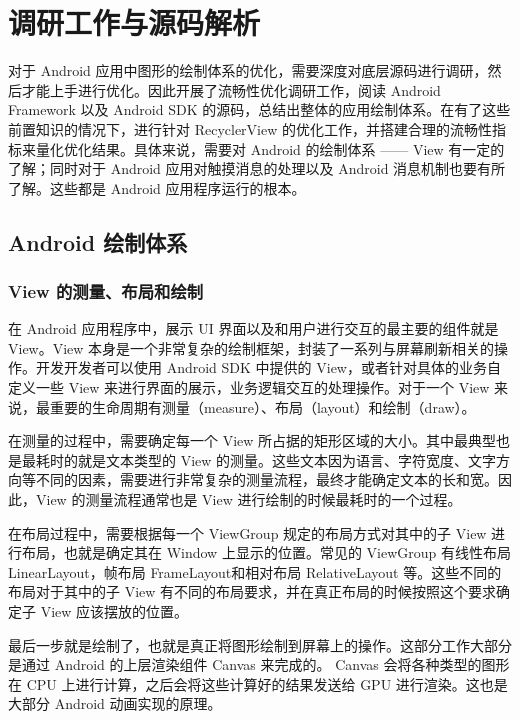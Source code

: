 \chapter{调研工作与源码解析}

对于 Android 应用中图形的绘制体系的优化，需要深度对底层源码进行调研，然后才能上手进行优化。因此开展了流畅性优化调研工作，阅读 Android Framework 以及 Android SDK 的源码，总结出整体的应用绘制体系。在有了这些前置知识的情况下，进行针对 RecyclerView 的优化工作，并搭建合理的流畅性指标来量化优化结果。具体来说，需要对 Android 的绘制体系 —— View 有一定的了解；同时对于 Android 应用对触摸消息的处理以及 Android 消息机制也要有所了解。这些都是 Android 应用程序运行的根本。

\section{Android 绘制体系}

\subsection{View 的测量、布局和绘制}

在 Android 应用程序中，展示 UI 界面以及和用户进行交互的最主要的组件就是 View。View 本身是一个非常复杂的绘制框架，封装了一系列与屏幕刷新相关的操作。开发开发者可以使用 Android SDK 中提供的 View，或者针对具体的业务自定义一些 View 来进行界面的展示，业务逻辑交互的处理操作。对于一个 View 来说，最重要的生命周期有测量（measure）、布局（layout）和绘制（draw）\cite{rountev2014static}。

在测量的过程中，需要确定每一个 View 所占据的矩形区域的大小。其中最典型也是最耗时的就是文本类型的 View 的测量。这些文本因为语言、字符宽度、文字方向等不同的因素，需要进行非常复杂的测量流程，最终才能确定文本的长和宽。因此，View 的测量流程通常也是 View 进行绘制的时候最耗时的一个过程。

在布局过程中，需要根据每一个 ViewGroup 规定的布局方式对其中的子 View 进行布局，也就是确定其在 Window 上显示的位置。常见的 ViewGroup 有线性布局 LinearLayout，帧布局 FrameLayout和相对布局 RelativeLayout 等。这些不同的布局对于其中的子 View 有不同的布局要求，并在真正布局的时候按照这个要求确定子 View 应该摆放的位置。

最后一步就是绘制了，也就是真正将图形绘制到屏幕上的操作。这部分工作大部分是通过 Android 的上层渲染组件 Canvas 来完成的。 Canvas 会将各种类型的图形在 CPU 上进行计算，之后会将这些计算好的结果发送给 GPU 进行渲染。这也是大部分 Android 动画实现的原理。

